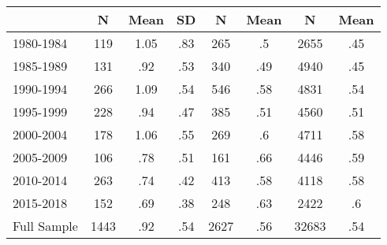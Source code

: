 \begin{tabular}{l*{7}{c}}
\toprule
                    &           N&        Mean&          SD&           N&        Mean&           N&        Mean\\
\midrule
1980-1984           &         119&        1.05&         .83&         265&          .5&        2655&         .45\\
1985-1989           &         131&         .92&         .53&         340&         .49&        4940&         .45\\
1990-1994           &         266&        1.09&         .54&         546&         .58&        4831&         .54\\
1995-1999           &         228&         .94&         .47&         385&         .51&        4560&         .51\\
2000-2004           &         178&        1.06&         .55&         269&          .6&        4711&         .58\\
2005-2009           &         106&         .78&         .51&         161&         .66&        4446&         .59\\
2010-2014           &         263&         .74&         .42&         413&         .58&        4118&         .58\\
2015-2018           &         152&         .69&         .38&         248&         .63&        2422&          .6\\
Full Sample         &        1443&         .92&         .54&        2627&         .56&       32683&         .54\\
\bottomrule
\end{tabular}
